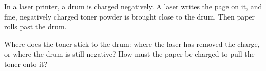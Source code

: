 In a laser printer, a drum is charged negatively. A laser writes the page on it, and fine, negatively charged toner powder is brought close to the drum. Then paper rolls past the drum.

\begin{abcliste}
\abc Where does the toner stick to the drum: where the laser has removed the charge, or where the drum is still negative?
\abc How must the paper be charged to pull the toner onto it?
\end{abcliste}
